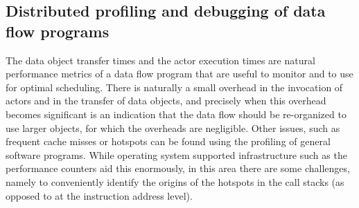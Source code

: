 \documentclass[11pt,a4paper]{article}
\begin{document}
\subsection{Distributed profiling and debugging of data flow programs}

The data object transfer times and the actor execution times are
natural performance metrics of a data flow program that are useful to
monitor and to use for optimal scheduling.  There is naturally a small
overhead in the invocation of actors and in the transfer of data
objects, and precisely when this overhead becomes significant is an
indication that the data flow should be re-organized to use larger
objects, for which the overheads are negligible.  Other issues, such
as frequent cache misses or hotspots can be found using the profiling
of general software programs.  While operating system supported
infrastructure such as the performance counters aid this enormously,
in this area there are some challenges, namely to conveniently
identify the origins of the hotspots in the call stacks (as opposed to
at the instruction address level).







\clearpage
{}
%
\end{document}
